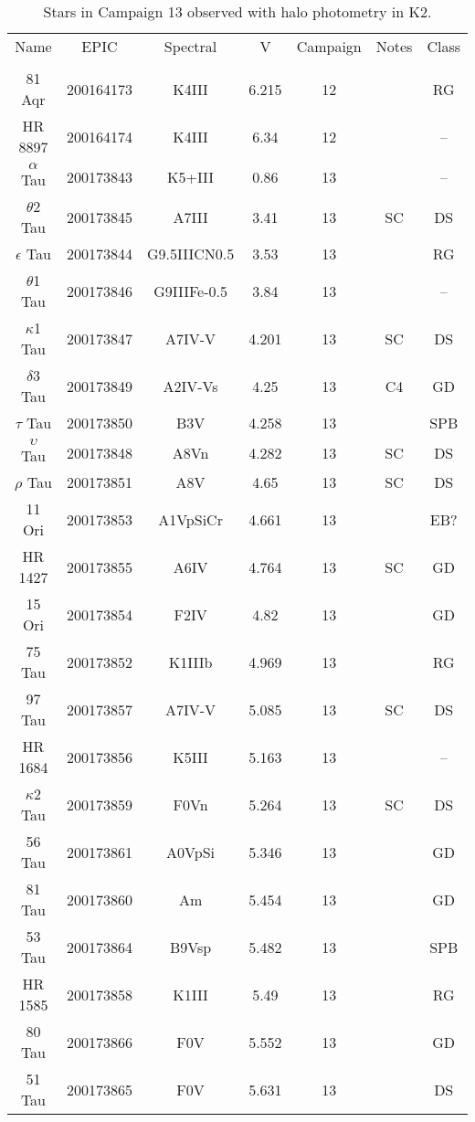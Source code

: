 \begin{table*}
\caption{Stars in Campaign 13 observed with halo photometry in K2.\label{table_3}}
\begin{tabular}{ccccccc}
\hline \hline
Name & EPIC & Spectral & V & Campaign & Notes & Class \\
 &  &  &  &  &  &  \\
\hline
81 Aqr & 200164173 & K4III & 6.215 & 12 &  & RG \\
HR 8897 & 200164174 & K4III & 6.34 & 12 &  & -- \\
$\alpha$ Tau & 200173843 & K5+III & 0.86 & 13 & \tablenotemark{c} & -- \\
$\theta$2 Tau & 200173845 & A7III & 3.41 & 13 & SC & DS \\
$\epsilon$ Tau & 200173844 & G9.5IIICN0.5 & 3.53 & 13 & \tablenotemark{d} & RG \\
$\theta$1 Tau & 200173846 & G9IIIFe-0.5 & 3.84 & 13 &  & -- \\
$\kappa$1 Tau & 200173847 & A7IV-V & 4.201 & 13 & SC & DS \\
$\delta$3 Tau & 200173849 & A2IV-Vs & 4.25 & 13 & C4 & GD \\
$\tau$ Tau & 200173850 & B3V & 4.258 & 13 &  & SPB \\
$\upsilon$ Tau & 200173848 & A8Vn & 4.282 & 13 & SC & DS \\
$\rho$ Tau & 200173851 & A8V & 4.65 & 13 & SC & DS \\
11 Ori & 200173853 & A1VpSiCr & 4.661 & 13 &  & EB? \\
HR 1427 & 200173855 & A6IV & 4.764 & 13 & SC & GD \\
15 Ori & 200173854 & F2IV & 4.82 & 13 &  & GD \\
75 Tau & 200173852 & K1IIIb & 4.969 & 13 &  & RG \\
97 Tau & 200173857 & A7IV-V & 5.085 & 13 & SC & DS \\
HR 1684 & 200173856 & K5III & 5.163 & 13 &  & -- \\
$\kappa$2 Tau & 200173859 & F0Vn & 5.264 & 13 & SC & DS \\
56 Tau & 200173861 & A0VpSi & 5.346 & 13 &  & GD \\
81 Tau & 200173860 & Am & 5.454 & 13 &  & GD \\
53 Tau & 200173864 & B9Vsp & 5.482 & 13 &  & SPB \\
HR 1585 & 200173858 & K1III & 5.49 & 13 &  & RG \\
80 Tau & 200173866 & F0V & 5.552 & 13 &  & GD \\
51 Tau & 200173865 & F0V & 5.631 & 13 &  & DS \\

\end{tabular}
\end{table*}
